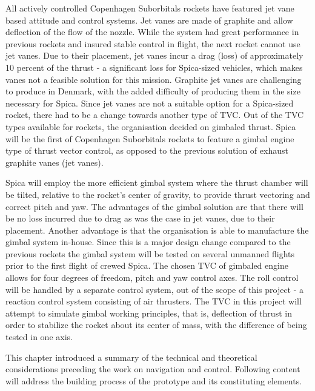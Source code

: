 All actively controlled Copenhagen Suborbitals rockets have featured jet vane based attitude and control systems. Jet vanes are made of graphite and allow deflection of the flow of the nozzle. While the system had great performance in previous rockets and insured stable control in flight, the next rocket cannot use jet vanes.
Due to their placement, jet vanes incur a drag (loss) of approximately 10 percent of the thrust - a significant loss for Spica-sized vehicles, which makes vanes not a feasible solution for this mission.
Graphite jet vanes are challenging to produce in Denmark, with the added difficulty of producing them in the size necessary for Spica.
Since jet vanes are not a suitable option for a Spica-sized rocket, there had to be a change towards another type of TVC. Out of the TVC types available for rockets, the organisation decided on gimbaled thrust.
Spica will be the first of Copenhagen Suborbitals rockets to feature a gimbal engine type of thrust vector control, as opposed to the previous solution of exhaust graphite vanes (jet vanes).

Spica will employ the more efficient gimbal system where the thrust chamber will be tilted, relative to the rocket’s center of gravity, to provide thrust vectoring and correct pitch and yaw. 
The advantages of the gimbal solution are that there will be no loss incurred due to drag as was the case in jet vanes, due to their placement. Another advantage is that the organisation is able to manufacture the gimbal system in-house. 
Since this is a major design change compared to the previous rockets the gimbal system will be tested on several unmanned flights prior to the first flight of crewed Spica.
The chosen TVC of gimbaled engine allows for four degrees of freedom, pitch and yaw control axes.
The roll control will be handled by a separate control system, out of the scope of this project - a reaction control system consisting of air thrusters. 
The TVC in this project will attempt to simulate gimbal working principles, that is, deflection of thrust in order to stabilize the rocket about its center of mass, with the difference of being tested in one axis.

This chapter introduced a summary of the technical and theoretical considerations preceding the work on navigation and control. Following content will address the building process of the prototype and its constituting elements.


